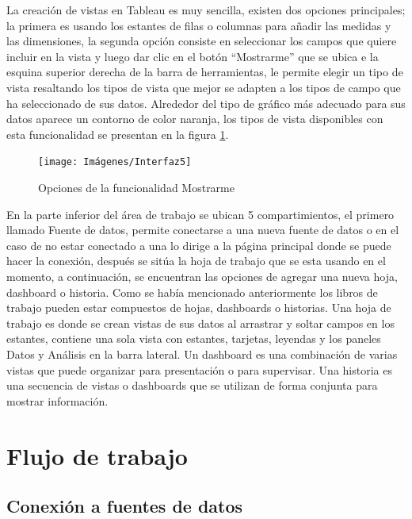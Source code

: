 \documentclass[
]{book}
\begin{document}
La creación de vistas en Tableau es muy sencilla, existen dos opciones principales; la primera es usando los estantes de filas o columnas para añadir las medidas y las dimensiones, la segunda opción consiste en seleccionar los campos que quiere incluir en la vista y luego dar clic en el botón ``Mostrarme'' que se ubica e la esquina superior derecha de la barra de herramientas, le permite elegir un tipo de vista resaltando los tipos de vista que mejor se adapten a los tipos de campo que ha seleccionado de sus datos. Alrededor del tipo de gráfico más adecuado para sus datos aparece un contorno de color naranja, los tipos de vista disponibles con esta funcionalidad se presentan en la figura \ref{fig:mostrarme-fig}.

\begin{figure}

{\centering \texttt{[image: Imágenes/Interfaz5]} 

}

\caption{Opciones de la funcionalidad Mostrarme}\label{fig:mostrarme-fig}
\end{figure}

En la parte inferior del área de trabajo se ubican 5 compartimientos, el primero llamado Fuente de datos, permite conectarse a una nueva fuente de datos o en el caso de no estar conectado a una lo dirige a la página principal donde se puede hacer la conexión, después se sitúa la hoja de trabajo que se esta usando en el momento, a continuación, se encuentran las opciones de agregar una nueva hoja, dashboard o historia. Como se había mencionado anteriormente los libros de trabajo pueden estar compuestos de hojas, dashboards o historias. Una hoja de trabajo es donde se crean vistas de sus datos al arrastrar y soltar campos en los estantes, contiene una sola vista con estantes, tarjetas, leyendas y los paneles Datos y Análisis en la barra lateral. Un dashboard es una combinación de varias vistas que puede organizar para presentación o para supervisar. Una historia es una secuencia de vistas o dashboards que se utilizan de forma conjunta para mostrar información.

\hypertarget{flujo-de-trabajo}{%
\section{Flujo de trabajo}\label{flujo-de-trabajo}}

\hypertarget{conexiuxf3n-a-fuentes-de-datos}{%
\subsection{Conexión a fuentes de datos}\label{conexiuxf3n-a-fuentes-de-datos}}
\end{document}
